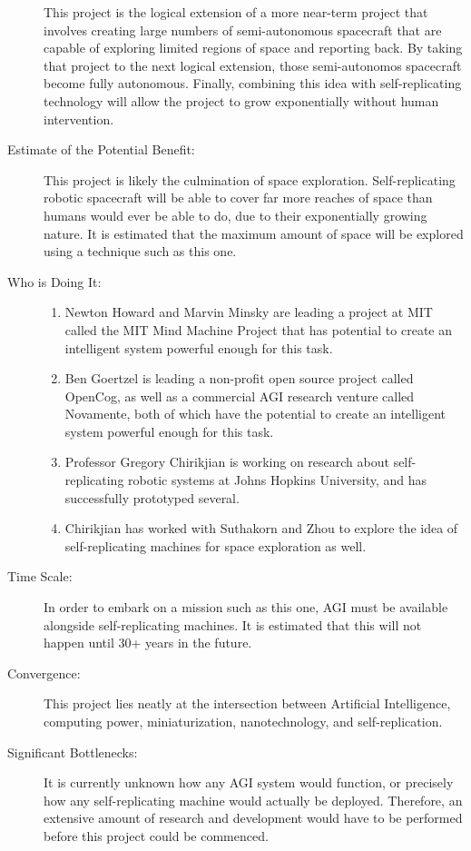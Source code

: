 \begin{description}
This project is the logical extension of a more near-term project
that involves creating large numbers of semi-autonomous spacecraft
that are capable of exploring limited regions of space and reporting
back. By taking that project to the next logical extension, those
semi-autonomos spacecraft become fully autonomous. Finally, combining
this idea with self-replicating technology will allow the project
to grow exponentially without human intervention.


\item[Estimate of the Potential Benefit:]

This project is likely the culmination of space exploration. Self-replicating
robotic spacecraft will be able to cover far more reaches of space
than humans would ever be able to do, due to their exponentially growing
nature. It is estimated that the maximum amount of space will be explored
using a technique such as this one.


\item[Who is Doing It:]
\hfill
\begin{enumerate}
\item Newton Howard and Marvin Minsky are leading a project at MIT called
the MIT Mind Machine Project that has potential to create an intelligent
system powerful enough for this task\cite{mmp}.
\item Ben Goertzel is leading a non-profit open source project called OpenCog,
as well as a commercial AGI research venture called Novamente, both
of which have the potential to create an intelligent system powerful
enough for this task\cite{goertzel}.
\item Professor Gregory Chirikjian is working on research about self-replicating
robotic systems at Johns Hopkins University, and has successfully
prototyped several\cite{chirikjian}.
\item Chirikjian has worked with Suthakorn and Zhou to explore the idea
of self-replicating machines for space exploration as well\cite{chirikjian2}.
\end{enumerate}

\item[Time Scale:]

In order to embark on a mission such as this one, AGI must be available
alongside self-replicating machines. It is estimated that this will
not happen until 30+ years in the future.


\item[Convergence:]

This project lies neatly at the intersection between Artificial Intelligence,
computing power, miniaturization, nanotechnology, and self-replication.


\item[Significant Bottlenecks:]

It is currently unknown how any AGI system would function, or precisely
how any self-replicating machine would actually be deployed. Therefore,
an extensive amount of research and development would have to be performed
before this project could be commenced.

\end{description}





